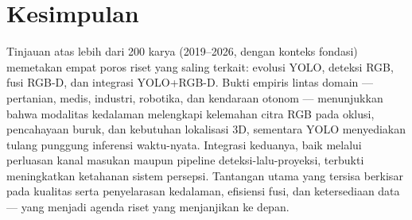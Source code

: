 \documentclass[11pt,a4paper]{article}
\begin{document}
\section{Kesimpulan}
Tinjauan atas lebih dari 200 karya (2019--2026, dengan konteks fondasi) memetakan
empat poros riset yang saling terkait: evolusi YOLO, deteksi RGB, fusi RGB-D, dan
integrasi YOLO+RGB-D. Bukti empiris lintas domain --- pertanian, medis, industri,
robotika, dan kendaraan otonom --- menunjukkan bahwa modalitas kedalaman
melengkapi kelemahan citra RGB pada oklusi, pencahayaan buruk, dan kebutuhan
lokalisasi 3D, sementara YOLO menyediakan tulang punggung inferensi waktu-nyata.
Integrasi keduanya, baik melalui perluasan kanal masukan maupun pipeline
deteksi-lalu-proyeksi, terbukti meningkatkan ketahanan sistem persepsi. Tantangan
utama yang tersisa berkisar pada kualitas serta penyelarasan kedalaman, efisiensi
fusi, dan ketersediaan data --- yang menjadi agenda riset yang menjanjikan ke
depan.



\end{document}
